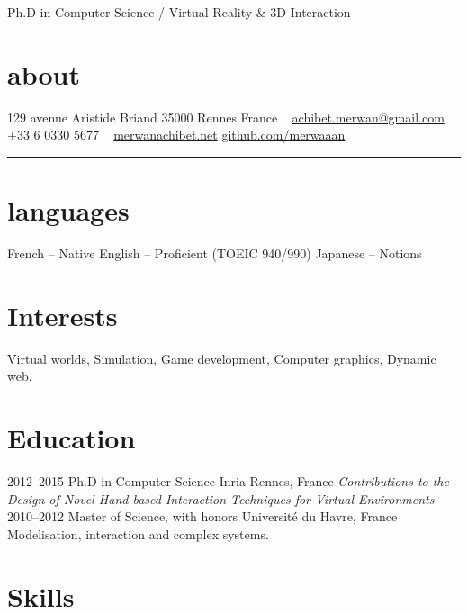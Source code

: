 \documentclass[]{friggeri-cv}
\begin{document}
       {Ph.D in Computer Science / Virtual Reality \& 3D Interaction}

\begin{aside}
  \section{about}\vspace{.25cm}
    129 avenue Aristide Briand
    35000 Rennes
    France
    ~
    \href{mailto:achibet.merwan@gmail.com}{achibet.merwan@gmail.com}
    +33 6 0330 5677
		~
    \href{http://merwanachibet.net}{merwanachibet.net}
    \href{http://github.com/merwaaan}{github.com/merwaaan}
    {\color{lightergray}\rule{3cm}{0.01cm}}
	\section{languages}\vspace{.25cm}
		French {\footnotesize -- Native}\vspace{.4cm}
		English {\footnotesize -- Proficient}
		{\footnotesize (TOEIC 940/990)}\vspace{.4cm}
		Japanese {\footnotesize -- Notions}
\end{aside}

\section{Interests}

Virtual worlds, Simulation, Game development, Computer graphics, Dynamic web.

\section{Education}

\begin{entrylist}
  \entry
    {2012–2015}
    {Ph.D in Computer Science}
    {Inria Rennes, France}
    {\it Contributions to the Design of Novel Hand-based Interaction Techniques for Virtual Environments}
  \entry
    {2010–2012}
    {Master of Science, with honors}
    {Université du Havre, France}
    {Modelisation, interaction and complex systems.}
\end{entrylist}

\section{Skills}
\end{document}
